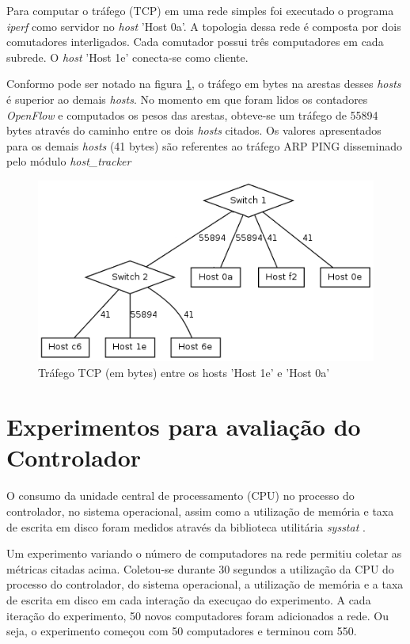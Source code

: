 Para computar o tráfego (TCP) em uma rede simples foi executado o programa 
\emph{iperf} como servidor no \emph{host} 'Host 0a'.
A topologia dessa rede é composta por dois comutadores interligados.
Cada comutador possui três computadores em cada subrede.
O \emph{host} 'Host 1e' conecta-se como cliente. 

Conformo pode ser notado na figura \ref{fig:iperf}, o tráfego 
em bytes na arestas desses \emph{hosts} é superior ao demais \emph{hosts}.
No momento em que foram lidos os contadores \emph{OpenFlow} e computados
os pesos das arestas, obteve-se um tráfego de 55894 bytes através do caminho
entre os dois \emph{hosts} citados.
Os valores apresentados para os demais \emph{hosts} (41 bytes) são referentes
ao tráfego ARP PING disseminado pelo módulo \emph{host\_tracker}

\begin{figure}[h!]
    \centering
    \includegraphics[scale=0.8]{img/graph-iperf}
    \caption{Tráfego TCP (em bytes) entre os hosts ’Host 1e’ e ’Host 0a’}
    \label{fig:iperf}
\end{figure}

\section{Experimentos para avaliação do Controlador}

O consumo da unidade central de processamento (CPU) no processo do controlador,
no sistema operacional, assim como a utilização de memória e taxa de escrita 
em disco foram medidos através da biblioteca utilitária \emph{sysstat} 
\citep{sebastien2015sysstat}.

Um experimento variando o número de computadores na rede permitiu coletar 
as métricas citadas acima.
Coletou-se durante 30 segundos a utilização da CPU do processo do controlador,
do sistema operacional, a utilização de memória e a taxa de escrita em disco
em cada interação da execuçao do experimento.
A cada iteração do experimento, 50 novos computadores foram adicionados a rede.
Ou seja, o experimento começou com 50 computadores e terminou com 550.

